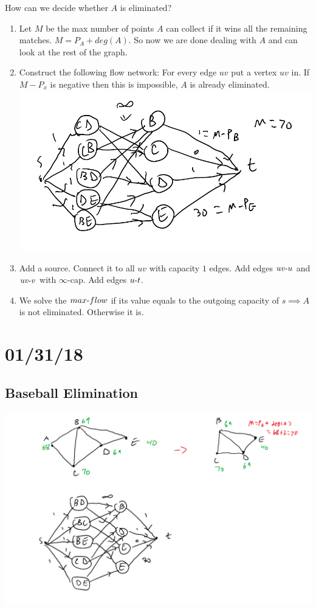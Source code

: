 \documentclass[12 pt]{article}
\begin{document}
        How can we decide whether $A$ is eliminated?
        \begin{enumerate}
        \item Let $M$ be the max number of points $A$ can collect if
          it wins all the remaining matches. $M = P_A + deg(A)$. So
          now we are done dealing with $A$ and can look at the rest of
          the graph.
        \item Construct the following flow network: For every edge
          $uv$ put a vertex $uv$ in. If $M-P_x$ is negative then this
          is impossible, $A$ is already eliminated.
          \\ \includegraphics[width=.9\textwidth]{i86.pdf}
        \item Add a source. Connect it to all $uv$ with capacity $1$
          edges. Add edges $uv \hbox{-}u$ and $uv\hbox{-}v$ with
          $\infty$-cap. Add edges $u\hbox{-}t$.
        \item We solve the $max\hbox{-}flow$ if its value equals to
          the outgoing capacity of $s \implies A$ is not
          eliminated. Otherwise it is.
        \end{enumerate}
        \section{01/31/18}
        \subsection{Baseball Elimination}
        \includegraphics[width=.9\textwidth]{i87.pdf}
\end{document}
